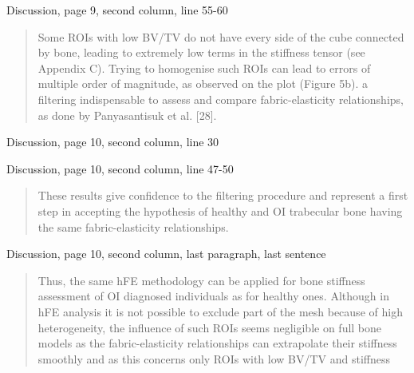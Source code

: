 \documentclass{AR2RC}
\begin{document}
\newpage
Discussion, page 9, second column, line 55-60
\begin{quote}
	Some ROIs with low BV/TV do not have every side of the cube connected by bone, leading to extremely low terms in the stiffness tensor (see Appendix C). Trying to homogenise such ROIs can lead to errors of multiple order of magnitude, as observed on the plot (Figure 5b).  a filtering  indispensable to assess and compare fabric-elasticity relationships, as done by Panyasantisuk et al. [28].
\end{quote}

Discussion, page 10, second column, line 30
\begin{quote}
\end{quote}

Discussion, page 10, second column, line 47-50
\begin{quote}
	These results give confidence to the filtering procedure and represent a first step in accepting the hypothesis of healthy and OI trabecular bone having the same fabric-elasticity relationships. 
\end{quote}

Discussion, page 10, second column, last paragraph, last sentence
\begin{quote}
	Thus, the same hFE methodology can be applied for bone stiffness assessment of OI diagnosed individuals as for healthy ones. Although in hFE analysis it is not possible to exclude part of the mesh because of high heterogeneity, the influence of such ROIs seems negligible on full bone models as the fabric-elasticity relationships can extrapolate their stiffness smoothly and as this concerns only ROIs with low BV/TV and stiffness
\end{quote}
\end{document}
